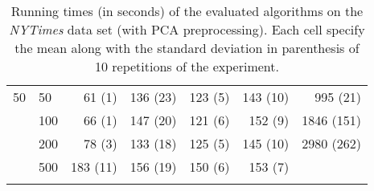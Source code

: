\begin{longtable}{llrrrrr}
 \midrule
50 & 50  &    61 (1) &       136 (23) &   123 (5) &             143 (10) &    995 (21) \\
   & 100 &    66 (1) &       147 (20) &   121 (6) &              152 (9) &  1846 (151) \\
   & 200 &    78 (3) &       133 (18) &   125 (5) &             145 (10) &  2980 (262) \\
   & 500 &  183 (11) &       156 (19) &   150 (6) &              153 (7) &          \\
\bottomrule
\caption{Running times (in seconds) of the evaluated algorithms on the \textit{NYTimes} data set (with PCA preprocessing). Each cell specify the mean along with the standard deviation in parenthesis of 10 repetitions of the experiment.}
\label{tab:running-time-mean-nytimes-pca}
\end{longtable}

